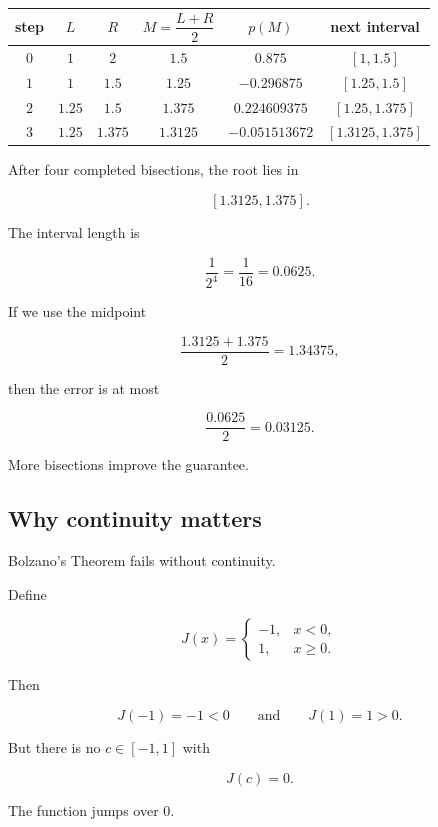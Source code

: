 \begin{center}
\renewcommand{\arraystretch}{1.45}
\begin{tabular}{c|c|c|c|c|c}
\textbf{step} & \(L\) & \(R\) & \(M=\dfrac{L+R}{2}\) & \(p(M)\) & \textbf{next interval} \\ \hline
\(0\) & \(1\) & \(2\) & \(1.5\) & \(0.875\) & \([1,1.5]\) \\
\(1\) & \(1\) & \(1.5\) & \(1.25\) & \(-0.296875\) & \([1.25,1.5]\) \\
\(2\) & \(1.25\) & \(1.5\) & \(1.375\) & \(0.224609375\) & \([1.25,1.375]\) \\
\(3\) & \(1.25\) & \(1.375\) & \(1.3125\) & \(-0.051513672\) & \([1.3125,1.375]\)
\end{tabular}
\end{center}

After four completed bisections, the root lies in

\[
[1.3125,1.375].
\]

The interval length is

\[
\frac1{2^4}=\frac1{16}=0.0625.
\]

If we use the midpoint

\[
\frac{1.3125+1.375}{2}=1.34375,
\]

then the error is at most

\[
\frac{0.0625}{2}=0.03125.
\]

More bisections improve the guarantee.

\subsection{Why continuity matters}
\label{appsubsec:bolzano-continuity-matters}

Bolzano's Theorem fails without continuity.

Define

\[
J(x)=
\begin{cases}
-1, & x<0,\\
1, & x\ge0.
\end{cases}
\]

Then

\[
J(-1)=-1<0
\qquad\text{and}\qquad
J(1)=1>0.
\]

But there is no \(c\in[-1,1]\) with

\[
J(c)=0.
\]

The function jumps over \(0\).

